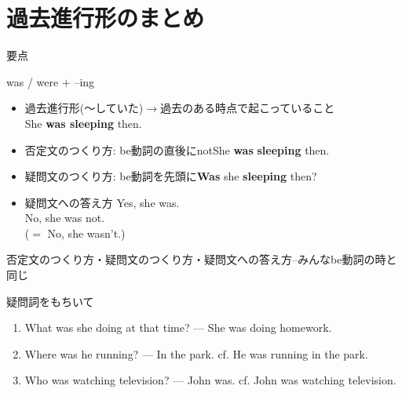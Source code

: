 \documentclass[aspectratio=169,xcolor={dvipsnames,table}]{beamer}
\begin{document}
\section{過去進行形のまとめ}
\begin{frame}[plain]{要点}
 
\begin{block}{was / were $+$ --ing}
\begin{itemize}[square]\small
 \item 過去進行形(〜していた)$\longrightarrow$過去のある時点で起こっていること\\%
\hfill{}She {\bfseries was sleeping} then.
 \item 否定文のつくり方: be動詞の直後にnot\hfill{}She {\bfseries was}  {\bfseries sleeping} then.
 \item 疑問文のつくり方: be動詞を先頭に\hfill{}{\bfseries Was} she {\bfseries sleeping} then?
 \item 疑問文への答え方
\hfill{}Yes, she was.\\
\hfill{}No, she was not.\\
\hfill{}($=$ No, she wasn't.)
\end{itemize}
\hfill{{\scriptsize 否定文のつくり方・疑問文のつくり方・疑問文への答え方--みんなbe動詞の時と同じ}}
\end{block}

\end{frame}
\begin{frame}[plain]{疑問詞をもちいて}
 \begin{enumerate}
  \item What was she doing at that time? --- She was doing homework.
  \item Where was he running? --- In the park.
	\mbox{}\hfill{}cf. He was running in the park.
  \item Who was watching television? --- John was.
	\mbox{}\hfill{}cf. John was watching television.
 \end{enumerate}

\hfill{}
\end{frame}
\end{document}
